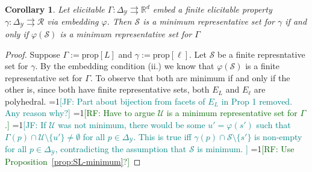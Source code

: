 \documentclass[11pt]{article}
\newcommand{\Comments}{1}
\newcommand{\mynote}[2]{\ifnum\Comments=1\textcolor{#1}{#2}\fi}
\newcommand{\raf}[1]{\mynote{darkgreen}{[RF: #1]}}
\newcommand{\jessie}[1]{\mynote{teal}{[JF: #1]}}
\newcommand{\reals}{\mathbb{R}}
\newcommand{\prop}[1]{\mathrm{prop}[#1]}
\newcommand{\simplex}{\Delta_\Y}
\newcommand{\R}{\mathcal{R}}
\newcommand{\Sc}{\mathcal{S}}
\newcommand{\U}{\mathcal{U}}
\newcommand{\Y}{\mathcal{Y}}
\newcommand{\toto}{\rightrightarrows}
\newtheorem{corollary}{Corollary}
\begin{document}
\begin{corollary}\label{cor:finite-embed-min-rep}
  Let elicitable $\Gamma : \simplex \toto \reals^d$ embed a finite elicitable property $\gamma:\simplex\toto\R$ via embedding $\varphi$.
  Then $\Sc$ is a minimum representative set for $\gamma$ if and only if $\varphi(\Sc)$ is a minimum representative set for $\Gamma$
\end{corollary}
\begin{proof}
  Suppose $\Gamma := \prop{L}$ and $\gamma := \prop{\ell}$.
  Let $\Sc$ be a finite represntative set for $\gamma$.
  By the embedding condition (ii.) we know that $\varphi(\Sc)$ is a finite representative set for $\Gamma$.
  To observe that both are minimum if and only if the other is, since both have finite representative sets, both $E_L$ and $E_\ell$ are polyhedral.
  \jessie{Part about bijection from facets of $E_L$ in Prop 1 removed. Any reason why?}
  \raf{Have to argue $\U$ is a minimum representative set for $\Gamma$.}
  \jessie{If $\U$ was not minimum, there would be some $u' = \varphi(s')$ such that $\Gamma(p) \cap \U \setminus \{u'\} \neq \emptyset$ for all $p \in \simplex$. This is true iff $\gamma(p) \cap \Sc \setminus \{s'\}$ is non-empty for all $p \in \simplex$, contradicting the assumption that $\Sc$ is minimum. }
  \raf{Use Proposition~\ref{prop:SL-minimum}?}
\end{proof}
\end{document}
